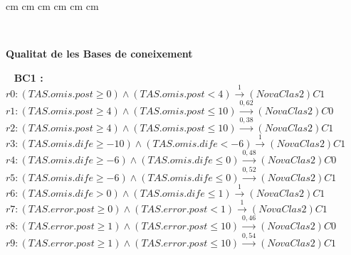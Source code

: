 \pagestyle{plain}
 cm
 cm
 cm
 cm
 cm
 cm

\setlength{\baselineskip}{1.5em}
\setlength{\parskip}{0em}
\setlength{\parsep}{0.5em}
\newcommand{\lge}[1]{\hbox{#1\kern-.1em\raise.5ex\hbox{.}\kern-.1em #1}}
\mbox{ } \vfill
\begin{center} \Large \bf Qualitat de les Bases de coneixement \end{center} \vfill

\newpage
\mbox{ }
{\Large \bf BC1 :}\\

$r0: (TAS.omis.post \geq 0) \wedge (TAS.omis.post < 4)\stackrel{1}{\longrightarrow} (NovaClas2)C1$\\

$r1: (TAS.omis.post \geq 4) \wedge (TAS.omis.post \leq 10)\stackrel{0,62}{\longrightarrow} (NovaClas2)C0$\\

$r2: (TAS.omis.post \geq 4) \wedge (TAS.omis.post \leq 10)\stackrel{0,38}{\longrightarrow} (NovaClas2)C1$\\

$r3: (TAS.omis.dife \geq -10) \wedge (TAS.omis.dife < -6)\stackrel{1}{\longrightarrow} (NovaClas2)C1$\\

$r4: (TAS.omis.dife \geq -6) \wedge (TAS.omis.dife \leq 0)\stackrel{0,48}{\longrightarrow} (NovaClas2)C0$\\

$r5: (TAS.omis.dife \geq -6) \wedge (TAS.omis.dife \leq 0)\stackrel{0,52}{\longrightarrow} (NovaClas2)C1$\\

$r6: (TAS.omis.dife>0) \wedge (TAS.omis.dife \leq 1)\stackrel{1}{\longrightarrow} (NovaClas2)C1$\\

$r7: (TAS.error.post \geq 0) \wedge (TAS.error.post < 1)\stackrel{1}{\longrightarrow} (NovaClas2)C1$\\

$r8: (TAS.error.post \geq 1) \wedge (TAS.error.post \leq 10)\stackrel{0,46}{\longrightarrow} (NovaClas2)C0$\\

$r9: (TAS.error.post \geq 1) \wedge (TAS.error.post \leq 10)\stackrel{0,54}{\longrightarrow} (NovaClas2)C1$\\

